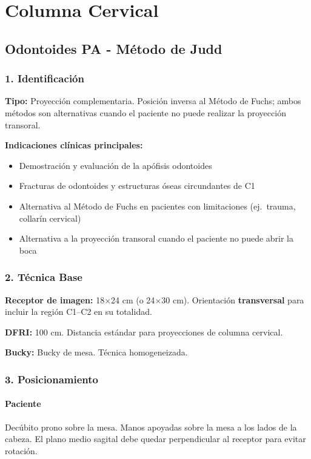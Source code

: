 	\section{Columna Cervical}
		
		\subsection{Odontoides PA - Método de Judd}
		
		\subsubsection*{1. Identificación}
		
		\textbf{Tipo:} Proyección complementaria. Posición inversa al Método de Fuchs; ambos métodos son alternativas cuando el paciente no puede realizar la proyección transoral.
		
		\textbf{Indicaciones clínicas principales:}
		\begin{itemize}
			\item Demostración y evaluación de la apófisis odontoides
			\item Fracturas de odontoides y estructuras óseas circundantes de C1
			\item Alternativa al Método de Fuchs en pacientes con limitaciones (ej.\ trauma, collarín cervical)
			\item Alternativa a la proyección transoral cuando el paciente no puede abrir la boca
		\end{itemize}
		
		\subsubsection*{2. Técnica Base}
		
		\textbf{Receptor de imagen:} 18$\times$24 cm (o 24$\times$30 cm). Orientación \textbf{transversal} para incluir la región C1--C2 en su totalidad.
		
		\textbf{DFRI:} 100 cm. Distancia estándar para proyecciones de columna cervical.
		
		\textbf{Bucky:} Bucky de mesa. Técnica homogeneizada.
		
		\subsubsection*{3. Posicionamiento}
		
		\paragraph{Paciente}
		Decúbito prono sobre la mesa. Manos apoyadas sobre la mesa a los lados de la cabeza. El plano medio sagital debe quedar perpendicular al receptor para evitar rotación.
		
